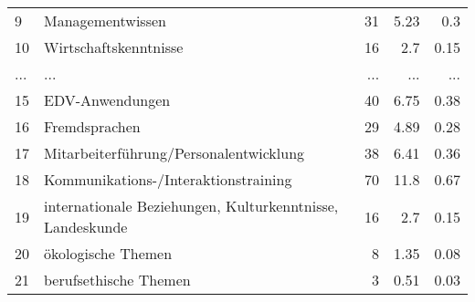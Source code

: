 \begin{longtable}{lXrrr}
        9 & \multicolumn{1}{X}{Managementwissen} & %
          \num{31} &
          \num[round-mode=places,round-precision=2]{5,23} &
          \num[round-mode=places,round-precision=2]{0,3} \\
        10 & \multicolumn{1}{X}{Wirtschaftskenntnisse} & %
          \num{16} &
          \num[round-mode=places,round-precision=2]{2,7} &
          \num[round-mode=places,round-precision=2]{0,15} \\
       ... & ... & ... & ... & ... \\
        15 & \multicolumn{1}{X}{EDV-Anwendungen} & %
          \num{40} &
          \num[round-mode=places,round-precision=2]{6,75} &
          \num[round-mode=places,round-precision=2]{0,38} \\

        16 & \multicolumn{1}{X}{Fremdsprachen} & %
          \num{29} &
          \num[round-mode=places,round-precision=2]{4,89} &
          \num[round-mode=places,round-precision=2]{0,28} \\

        17 & \multicolumn{1}{X}{Mitarbeiterführung/Personalentwicklung} & %
          \num{38} &
          \num[round-mode=places,round-precision=2]{6,41} &
          \num[round-mode=places,round-precision=2]{0,36} \\

        18 & \multicolumn{1}{X}{Kommunikations-/Interaktionstraining} & %
          \num{70} &
          \num[round-mode=places,round-precision=2]{11,8} &
          \num[round-mode=places,round-precision=2]{0,67} \\

        19 & \multicolumn{1}{X}{internationale Beziehungen, Kulturkenntnisse, Landeskunde} & %
          \num{16} &
          \num[round-mode=places,round-precision=2]{2,7} &
          \num[round-mode=places,round-precision=2]{0,15} \\

        20 & \multicolumn{1}{X}{ökologische Themen} & %
          \num{8} &
          \num[round-mode=places,round-precision=2]{1,35} &
          \num[round-mode=places,round-precision=2]{0,08} \\

        21 & \multicolumn{1}{X}{berufsethische Themen} & %
          \num{3} &
          \num[round-mode=places,round-precision=2]{0,51} &
          \num[round-mode=places,round-precision=2]{0,03} \\


\end{longtable}
